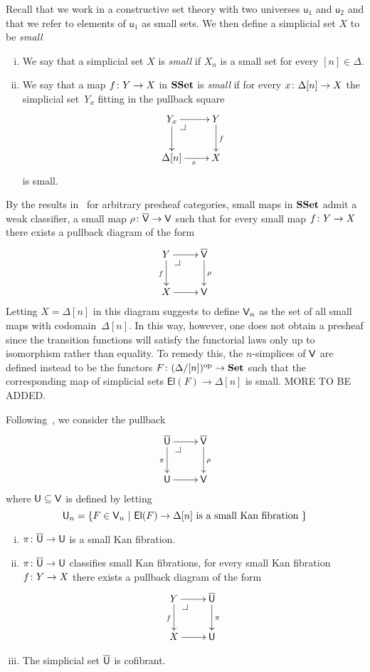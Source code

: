 \documentclass[reqno,10pt,a4paper,oneside,draft]{amsart}
\begin{document}
Recall that we work in a constructive set theory with two universes $\mathsf{u}_1$ and $\mathsf{u}_2$
and that we refer to elements of $\mathsf{u}_1$ as small sets. We then define a simplicial
set $X$ to be \emph{small}


\begin{definition} \hfill 
\label{thm:small}
\begin{enumerate}[(i)]
\item We say that a simplicial set $X$ is \emph{small}  if $X_n$ is a small set for every $[n] \in \Delta$. 
\item We say that a map $f \colon Y \to X$ in $\mathbf{SSet}$ is \emph{small} if for every $x \colon \Delta[n] 
\to X$ the simplicial set~$Y_x$ fitting in the pullback square
\[
\xymatrix{
Y_x \ar[r] \ar[d] \drpullback & Y \ar[d]^{f} \\
\Delta[n] \ar[r]_x & X }
\]
is small.
\end{enumerate}
\end{definition} 

By the results in~\cite{hofmann-streicher-universes} for arbitrary presheaf categories, small maps in
 $\mathbf{SSet}$ admit a weak classifier, \ie a small map $\rho \colon \overline{\mathsf{V}} \to \mathsf{V}$ such 
that for every small map $f \colon Y \to X$ there exists  a pullback diagram of the form
\[
\xymatrix{
Y \ar[r] \ar[d]_f \drpullback  & \VV \ar[d]^\rho \\
X \ar[r] & \V }
\]
Letting $X = \Delta[n]$ in this diagram suggests to define $\mathsf{V}_n$ as the set of all small maps with codomain~$\Delta[n]$. In this way, however, one does not obtain a presheaf since the transition functions
will satisfy the functorial laws only up to isomorphism rather than equality. To remedy this, the $n$-simplices of $\mathsf{V}$ are defined instead to be the functors $F \colon (\Delta/[n])^{\operatorname{op}} \to \mathbf{Set}$ such that 
the corresponding map of simplicial sets $ \mathsf{El}(F) \to \Delta[n]$ is small. MORE TO BE ADDED.

\medskip

Following~\cite{cisinski-univalence,voevodsky-simplicial-model}, we consider the pullback 
\[
\xymatrix{
\UU \ar[r] \ar[d]_\pi \drpullback  & \VV \ar[d]^\rho \\
\U \ar[r] & \V }
\]
where $\mathsf{U} \subseteq \mathsf{V}$ is defined by letting 
\[
\mathsf{U}_n = \{ F \in \mathsf{V}_n \ | \ \mathsf{El}(F) \to \Delta[n] \text{ is a small Kan fibration } \}
\]


\begin{proposition} \label{thm:universe-u}  \hfill 
\begin{enumerate}[(i)] 
\item $\pi \colon \overline{\mathsf{U}} \to \mathsf{U}$ is a small Kan fibration.
\item $\pi \colon \overline{\mathsf{U}} \to \mathsf{U}$ classifies small Kan fibrations, \ie 
for every small Kan fibration $f \colon Y \to X$ there exists  a pullback diagram of the form
\[
\xymatrix{
Y \ar[r] \ar[d]_f \drpullback & \UU \ar[d]^\pi \\
X \ar[r] & \U }
\]
\item  The simplicial set $\overline{\mathsf{U}}$ is cofibrant.
\end{enumerate}
\end{proposition}
\end{document}
